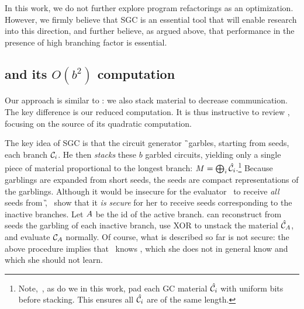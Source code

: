 In this work, we do not further explore program refactorings as an
optimization.
However, we firmly believe that SGC is an essential tool that will
enable research into this direction, and further believe, as argued
above, that performance in the presence of high branching factor is
essential.




\subsection{\HK and its $O(b^2)$ computation}
\label{sec:bsquaredcost}

Our approach is similar to \HK: we also stack material
to decrease communication.
The key difference is our reduced computation.
It is thus instructive to review \HK,
focusing on the source of its quadratic computation.

The key idea of SGC is that the circuit generator \G\ garbles,
starting from seeds, each branch $\mathcal C_i$.
He then \emph{stacks} these $b$ garbled circuits, yielding only a
single piece of material proportional to the longest branch: $M =
\bigoplus_i \hat{\mathcal C}_i$.\footnote{Note,~\HK, as do we in this work,  pad each GC
material $\hat{\mathcal C}_i$ with uniform bits before stacking.  This ensures all
$\hat{\mathcal C}_i$ are of the same length.}
Because garblings are expanded from short seeds, the
seeds are compact representations of the garblings.
%
Although it would be insecure for the evaluator \E\ to receive
\emph{all} seeds from \G, \HK\ show that it \emph{is secure} for her
to receive seeds corresponding to the inactive branches.
Let $A$ be the id of the active branch.
\E can reconstruct from seeds the garbling of each inactive branch, use XOR to unstack
the material $\hat{\mathcal C}_{A}$, and evaluate $\mathcal C_{A}$ normally.
%
Of course, what is described so far is not secure: the above procedure
implies that \E\ knows \aid, which she does not in general
know and which she should not learn.


